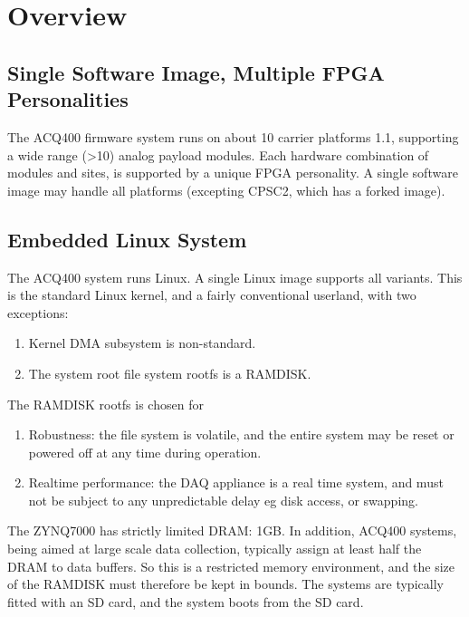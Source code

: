 \documentclass[]{article}
\begin{document}
\section{Overview}

\subsection{Single Software Image, Multiple FPGA Personalities}
The ACQ400 firmware system runs on about 10 carrier platforms 1.1, supporting a wide range (>10) analog payload modules.  Each hardware combination of modules and sites, is supported by a unique FPGA personality. A single software image may handle all platforms (excepting CPSC2, which has a forked image).

\subsection{Embedded Linux System}
The ACQ400 system runs Linux. A single Linux image supports all variants. This is the standard Linux kernel, and a fairly conventional userland, with two exceptions:
\begin{enumerate}
    \item Kernel DMA subsystem is non-standard.
    \item The system root file system rootfs is a RAMDISK. 
\end{enumerate} 

The RAMDISK rootfs is chosen for 
\begin{enumerate}
    \item Robustness: the file system is volatile, and the entire system may be reset or powered off at any time during operation. 
    \item Realtime performance: the DAQ appliance is a real time system, and must not be subject to any unpredictable delay eg disk access, or swapping.
\end{enumerate} 
The ZYNQ7000 has strictly limited DRAM: 1GB. In addition, ACQ400 systems, being aimed at large scale data collection, typically assign at least half the DRAM to data buffers. So this is a restricted memory environment, and the size of the RAMDISK must therefore be kept in bounds.
The systems are typically fitted with an SD card, and the system boots from the SD card.
\end{document}
